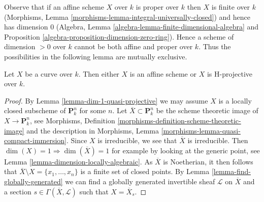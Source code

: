 \noindent
Observe that if an affine scheme $X$ over $k$ is proper over $k$
then $X$ is finite over $k$ (Morphisms, Lemma
\ref{morphisms-lemma-integral-universally-closed}) and hence has
dimension $0$
(Algebra, Lemma \ref{algebra-lemma-finite-dimensional-algebra} and
Proposition \ref{algebra-proposition-dimension-zero-ring}).
Hence a scheme of dimension $> 0$ over $k$ cannot be both affine and
proper over $k$. Thus the possibilities in the following lemma are
mutually exclusive.

\begin{lemma}
\label{lemma-curve-affine-projective}
Let $X$ be a curve over $k$. Then either $X$ is an affine scheme or $X$
is H-projective over $k$.
\end{lemma}

\begin{proof}
By Lemma \ref{lemma-dim-1-quasi-projective} we may assume $X$ is a
locally closed subscheme of $\mathbf{P}^n_k$ for some $n$. Let
$\overline{X} \subset \mathbf{P}^n_k$ be the scheme theoretic image
of $X \to \mathbf{P}^n_k$, see Morphisms, Definition
\ref{morphisms-definition-scheme-theoretic-image}
and the description in
Morphisms, Lemma \ref{morphisms-lemma-quasi-compact-immersion}.
Since $X$ is irreducible, we see that $\overline{X}$ is irreducible.
Then $\dim(X) = 1 \Rightarrow \dim(\overline{X}) = 1$ for example by
looking at the generic point, see
Lemma \ref{lemma-dimension-locally-algebraic}.
As $\overline{X}$ is Noetherian, it then
follows that $\overline{X} \setminus X = \{x_1, \ldots, x_n\}$
is a finite set of closed points. By Lemma \ref{lemma-find-globally-generated}
we can find a globally generated invertible sheaf $\mathcal{L}$
on $\overline{X}$ and a section $s \in \Gamma(\overline{X}, \mathcal{L})$
such that $X = \overline{X}_s$.


\end{proof}
